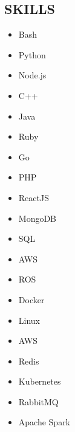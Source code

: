 \documentclass[]{res}
\begin{document}
\address{
Bachelor of Software Engineering (BSE), University of Waterloo 2018 \\
(415) 980-9210 \textbar ~paul.ashbourne@gmail.com \\
\url{www.github.com/paulashbourne} %
}
\address{855 Brannan St. Unit 474 \\ \hfill San Francisco, California \\ \hfill USA 94103}
\begin{resume}

\section{SKILLS}
\setlength\multicolsep{0pt}
\begin{multicols}{5}
  \begin{itemize}
    \item Bash
    \item Python
    \item Node.js
    \item C++
    \item Java
    \item Ruby
    \item Go
    \item PHP
    \item ReactJS
    \item MongoDB
    \item SQL
    \item AWS
    \item ROS
    \item Docker
    \item Linux
    \item AWS
    \item Redis
    \item Kubernetes
    \item RabbitMQ
    \item Apache Spark
  \end{itemize}
\end{multicols}


\end{resume}
\end{document}
